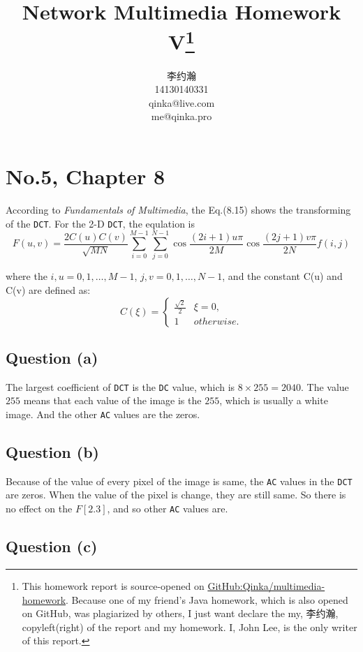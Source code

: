 \documentclass{article}
\title{Network Multimedia Homework V\thanks{%
        This homework report is source-opened on
        \href{https://github.com/Qinka/multimedia-homework}{GitHub:Qinka/multimedia-homework}.
        Because one of my friend's Java homework, which is also opened on GitHub, was plagiarized by others, I just want declare the my, 李约瀚, copyleft(right) of the report and my homework.
        I, John Lee, is the only writer of this report.
    }}
\author{李约瀚 \\ 14130140331 \\ qinka@live.com \\ me@qinka.pro}
\def\vFundamentalsOfMutimedia{\textit{Fundamentals of Multimedia}}
\begin{document}
    
    \maketitle
    
    \section{No.5, Chapter 8}
    According to \vFundamentalsOfMutimedia, the Eq.(8.15) shows the transforming of the \verb|DCT|.
    For the 2-D \verb|DCT|, the equlation is 
    \begin{equation}
    \label{eq:dct:baseeq}
    F(u,v) = \frac{2C(u)C(v)}{\sqrt{MN}}\sum\limits_{i=0}^{M-1}\sum\limits_{j=0}^{N-1}\cos\frac{(2i+1)u\pi}{2M}\cos\frac{(2j+1)v\pi}{2N}f(i,j)
    \end{equation}
    
    where the $i,u = 0,1,\dots,M-1$, $j,v = 0,1,\dots,N-1$, and the constant C(u) and C(v) are defined as:
    \begin{equation}
    C(\xi) = \left\{
    \begin{array}{cl}
    \frac{\sqrt{2}}{2} & \xi = 0, \\
    1 & otherwise.
    \end{array}
    \right.
    \end{equation}
    
    \subsection{Question (a)}
    
    The largest coefficient of \verb|DCT| is the \verb|DC| value, which is $8 \times 255 = 2040$.
    The value $255$ means that each value of the image is the $255$, which is usually
    a white image. And the other \verb|AC| values are the zeros.
    
    \subsection{Question (b)}
    
    Because of the value of every pixel of the image is same, the \verb|AC| values in the \verb|DCT| are zeros. 
    When the value of the pixel is change, they are still same. So there is no effect on the $F[2.3]$, and so other \verb|AC| values are.
    
    \subsection{Question (c)}
    
\end{document}
